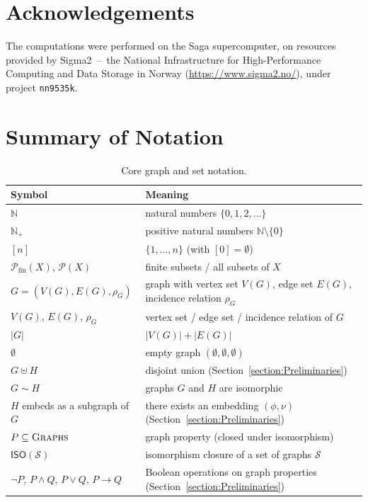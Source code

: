 \documentclass[11pt,a4paper]{article}
\newcommand{\Nplus}{\mathbb{N}_{+}}
\newcommand{\N}{\mathbb{N}}
\newcommand{\vertexset}[1]{V(#1)}
\newcommand{\edgeset}[1]{E(#1)}
\newcommand{\incidencerelationname}{\rho}
\newcommand{\incidencerelation}[1]{\incidencerelationname_{#1}}
\newcommand{\finitepowerset}[1]{\mathcal{P}_{\mathrm{fin}}(#1)}
\newcommand{\powerset}[1]{\mathcal{P}(#1)}
\newcommand{\isomorphismclosure}[1]{\mathsf{ISO}(#1)}
\newcommand{\allgraphs}{\textsc{Graphs}}
\begin{document}
\FloatBarrier

\section*{Acknowledgements}
The computations were performed on the Saga supercomputer, on resources provided by Sigma2~--~the National Infrastructure for High-Performance Computing and Data Storage in Norway (\url{https://www.sigma2.no/}), under project \texttt{nn9535k}.



	\clearpage
		\appendix
\clearpage
{}
\section*{Summary of Notation}
\label{appendix:notation-quickref}

\begin{table}[H]
\centering
\footnotesize
\begin{tabularx}{\textwidth}{@{}lX@{}}
\hline
\textbf{Symbol} & \textbf{Meaning} \\
\hline
$\N$ & natural numbers $\{0,1,2,\dots\}$ \\
$\Nplus$ & positive natural numbers $\N\setminus\{0\}$ \\
$[n]$ & $\{1,\dots,n\}$ (with $[0]=\emptyset$) \\
$\finitepowerset{X}$, $\powerset{X}$ & finite subsets / all subsets of $X$ \\
$G=(\vertexset{G},\edgeset{G},\incidencerelation{G})$ & graph with vertex set $\vertexset{G}$, edge set $\edgeset{G}$, incidence relation $\incidencerelation{G}$ \\
$\vertexset{G}$, $\edgeset{G}$, $\incidencerelation{G}$ & vertex set / edge set / incidence relation of $G$ \\
$|G|$ & $|\vertexset{G}|+|\edgeset{G}|$ \\
$\emptyset$ & empty graph $(\emptyset,\emptyset,\emptyset)$ \\
$G\uplus H$ & disjoint union (Section~\ref{section:Preliminaries}) \\
$G\sim H$ & graphs $G$ and $H$ are isomorphic \\
$H$ embeds as a subgraph of $G$ & there exists an embedding $(\phi,\nu)$ (Section~\ref{section:Preliminaries}) \\
$P\subseteq \allgraphs$ & graph property (closed under isomorphism) \\
$\isomorphismclosure{\mathcal{S}}$ & isomorphism closure of a set of graphs $\mathcal{S}$ \\
$\neg P$, $P\wedge Q$, $P\vee Q$, $P\to Q$ & Boolean operations on graph properties (Section~\ref{section:Preliminaries}) \\
\hline
\end{tabularx}
\caption{Core graph and set notation.}
\label{table:notation}
\end{table}
\end{document}
